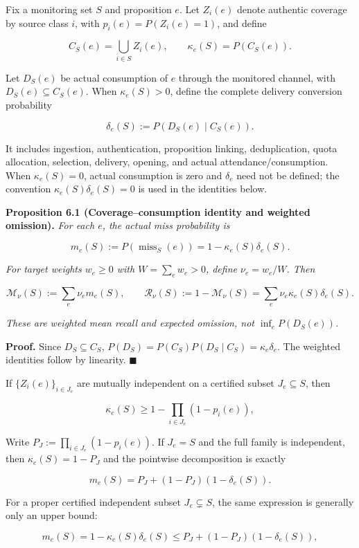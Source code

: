 \documentclass[
  11pt]{article}
\begin{document}
Fix a monitoring set \(S\) and proposition \(e\). Let \(Z_i(e)\) denote
authentic coverage by source class \(i\), with \(p_i(e)=P(Z_i(e)=1)\),
and define

\[C_S(e)=\bigcup_{i\in S}Z_i(e),\qquad \kappa_e(S)=P(C_S(e)).\]

Let \(D_S(e)\) be actual consumption of \(e\) through the monitored
channel, with \(D_S(e)\subseteq C_S(e)\). When \(\kappa_e(S)>0\), define
the complete delivery conversion probability

\[\delta_e(S):=P(D_S(e)\mid C_S(e)).\]

It includes ingestion, authentication, proposition linking,
deduplication, quota allocation, selection, delivery, opening, and
actual attendance/consumption. When \(\kappa_e(S)=0\), actual
consumption is zero and \(\delta_e\) need not be defined; the convention
\(\kappa_e(S)\delta_e(S)=0\) is used in the identities below.

\textbf{Proposition 6.1 (Coverage--consumption identity and weighted
omission).} \emph{For each \(e\), the actual miss probability is}

\[m_e(S):=P(\operatorname{miss}_S(e))=1-\kappa_e(S)\delta_e(S).\tag{7}\]

\emph{For target weights \(w_e\ge0\) with \(W=\sum_ew_e>0\), define
\(\nu_e=w_e/W\). Then}

\[\mathcal M_\nu(S):=\sum_e\nu_em_e(S),\qquad \mathcal R_\nu(S):=1-\mathcal M_\nu(S)=\sum_e\nu_e\kappa_e(S)\delta_e(S).\tag{8}\]

\emph{These are weighted mean recall and expected omission, not
\(\inf_e P(D_S(e))\).}

\textbf{Proof.} Since \(D_S\subseteq C_S\),
\(P(D_S)=P(C_S)P(D_S\mid C_S)=\kappa_e\delta_e\). The weighted
identities follow by linearity. \(\blacksquare\)

If \(\{Z_i(e)\}_{i\in J_e}\) are mutually independent on a certified
subset \(J_e\subseteq S\), then

\[\kappa_e(S)\ge1-\prod_{i\in J_e}(1-p_i(e)),\]

Write \(P_J:=\prod_{i\in J_e}(1-p_i(e))\). If \(J_e=S\) and the full
family is independent, then \(\kappa_e(S)=1-P_J\) and the pointwise
decomposition is exactly

\[m_e(S)=P_J+(1-P_J)(1-\delta_e(S)).\]

For a proper certified independent subset \(J_e\subsetneq S\), the same
expression is generally only an upper bound:

\[m_e(S)=1-\kappa_e(S)\delta_e(S)\le P_J+(1-P_J)(1-\delta_e(S)),\]
\end{document}
